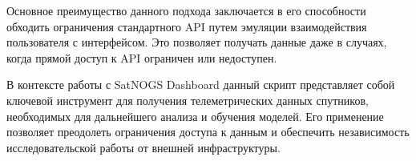 Основное преимущество данного подхода заключается в его способности обходить
ограничения стандартного API путем эмуляции взаимодействия пользователя с
интерфейсом. Это позволяет получать данные даже в случаях, когда прямой доступ
к API ограничен или недоступен.

В контексте работы с SatNOGS Dashboard данный скрипт представляет собой
ключевой инструмент для получения телеметрических данных спутников, необходимых
для дальнейшего анализа и обучения моделей. Его применение позволяет преодолеть
ограничения доступа к данным и обеспечить независимость исследовательской
работы от внешней инфраструктуры.

